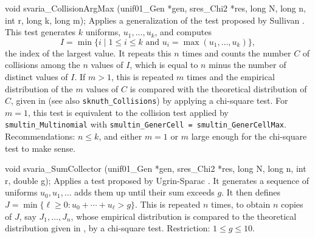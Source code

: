 void svaria_CollisionArgMax (unif01_Gen *gen, sres_Chi2 *res,
                             long N, long n, int r, long k, long m);
\endcode
 \tab
  Applies a generalization of the test proposed by Sullivan \cite{rSUL93a}.
  This test generates $k$ uniforms, $u_1,\dots,u_k$, and computes
   $$
     I = \min \Big\{ i \mid 1\le i\le k \mbox{ and }
          u_i = \max (u_1,\dots,u_k) \Big\},
   $$
  the index of the largest value.
  It repeats this $n$ times and  counts the number $C$ of collisions
  among the $n$ values of $I$, which is equal to
  $n$ minus the number of distinct values of $I$.
  If $m > 1$, this is repeated $m$ times and the empirical distribution
  of the $m$ values of $C$ is compared with the theoretical distribution of
  $C$, given in \cite{rKNU98a} (see also {\tt sknuth\_Collisions})
  by applying a chi-square test.
  For $m=1$, this test is equivalent to the collision test applied by
  {\tt smultin\_Multinomial} with
  {\tt smultin\_GenerCell = smultin\_GenerCellMax}.
  Recommendations: $n \le k$, and either $m=1$ or $m$
  large enough for the chi-square test to make sense.
 \endtab
\code


void svaria_SumCollector (unif01_Gen *gen, sres_Chi2 *res,
                          long N, long n, int r, double g);
\endcode
 \tab Applies a test proposed by
  Ugrin-Sparac \cite{rUGR91a}.
  It generates a sequence of uniforms $u_0,u_1,\dots$ adds them up
  until their sum exceeds $g$.  It then defines
  $J = \min\{\ell\ge 0 : u_0 + \cdots + u_{\ell} > g \}$.
  This is repeated $n$ times, to obtain $n$ copies of $J$, say
  $J_1,\dots,J_n$, whose empirical distribution is compared to the
  theoretical distribution given in \cite{rUGR91a}, by a chi-square test.
   Restriction: $1 \le g \le 10$.
 \endtab
\code



